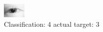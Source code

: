 \begin{figure}[h!]
\begin{center}
\includegraphics[width=0.60\columnwidth]{figures/ID79_class_4_target_3.png}
\end{center}
\caption{ Classification: 4 actual target: 3}
\label{fig:ID79_class_4_target_3}
\end{figure}
